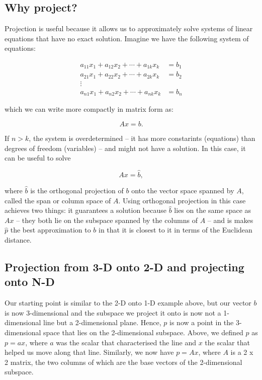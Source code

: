 \documentclass[
  letterpaper,
  DIV=11,
  numbers=noendperiod]{scrartcl}
\begin{document}
\hypertarget{why-project}{%
\subsection{Why project?}\label{why-project}}

Projection is useful because it allows us to approximately solve systems
of linear equations that have no exact solution. Imagine we have the
following system of equations:

\[
\begin{align*}
a_{11}x_1 + a_{12}x_2 + \cdots + a_{1k}x_k &= b_1 \\
a_{21}x_1 + a_{22}x_2 + \cdots + a_{2k}x_k &= b_2 \\
\vdots \\
a_{n1}x_1 + a_{n2}x_2 + \cdots + a_{nk}x_k &= b_n
\end{align*}
\]

which we can write more compactly in matrix form as:

\[
Ax = b.
\]

If \(n > k\), the system is overdetermined -- it has more constarints
(equations) than degrees of freedom (variables) -- and might not have a
solution. In this case, it can be useful to solve

\[
Ax = \hat{b},
\]

where \(\hat{b}\) is the orthogonal projection of \(b\) onto the vector
space spanned by \(A\), called the span or column space of \(A\). Using
orthogonal projection in this case achieves two things: it guarantees a
solution because \(\hat{b}\) lies on the same space as \(Ax\) -- they
both lie on the subspace spanned by the columns of \(A\) -- and is makes
\(\hat{p}\) the best approximation to \(b\) in that it is closest to it
in terms of the Euclidean distance.

\hypertarget{projection-from-3-d-onto-2-d-and-projecting-onto-n-d}{%
\subsection{Projection from 3-D onto 2-D and projecting onto
N-D}\label{projection-from-3-d-onto-2-d-and-projecting-onto-n-d}}

Our starting point is similar to the 2-D onto 1-D example above, but our
vector \(b\) is now 3-dimensional and the subspace we project it onto is
now not a 1-dimensional line but a 2-dimensional plane. Hence, \(p\) is
now a point in the 3-dimensional space that lies on the 2-dimensional
subspace. Above, we defined \(p\) as \(p = ax\), where \(a\) was the
scalar that characterised the line and \(x\) the scalar that helped us
move along that line. Similarly, we now have \(p = Ax\), where \(A\) is
a 2 x 2 matrix, the two columns of which are the base vectors of the
2-dimensional subspace.
\end{document}
